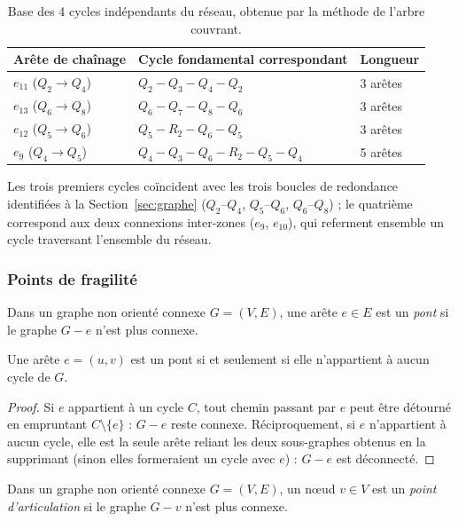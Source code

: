 \documentclass[11pt]{ama-article}
\begin{document}
\begin{table}[h]
\centering
\begin{tabular}{@{}lll@{}}
\toprule
Arête de chaînage & Cycle fondamental correspondant & Longueur \\
\midrule
$e_{11}$ ($Q_2\to Q_4$) & $Q_2-Q_3-Q_4-Q_2$ & 3 arêtes \\
$e_{13}$ ($Q_6\to Q_8$) & $Q_6-Q_7-Q_8-Q_6$ & 3 arêtes \\
$e_{12}$ ($Q_5\to Q_6$) & $Q_5-R_2-Q_6-Q_5$ & 3 arêtes \\
$e_{9}$ ($Q_4\to Q_5$) & $Q_4-Q_3-Q_6-R_2-Q_5-Q_4$ & 5 arêtes \\
\bottomrule
\end{tabular}
\caption{Base des 4 cycles indépendants du réseau, obtenue par la méthode de l'arbre couvrant.}
\label{tab:cycles}
\end{table}

Les trois premiers cycles coïncident avec les trois boucles de redondance identifiées à la
Section~\ref{sec:graphe} ($Q_2$--$Q_4$, $Q_5$--$Q_6$, $Q_6$--$Q_8$) ; le quatrième correspond
aux deux connexions inter-zones ($e_9$, $e_{10}$), qui referment ensemble un cycle traversant
l'ensemble du réseau.

\subsubsection{Points de fragilité}
\label{sec:ponts}

\begin{definition}[Pont]
Dans un graphe non orienté connexe $G=(V,E)$, une arête $e\in E$ est un \emph{pont} si le
graphe $G-e$ n'est plus connexe.
\end{definition}

\begin{proposition}
Une arête $e=(u,v)$ est un pont si et seulement si elle n'appartient à aucun cycle de $G$.
\end{proposition}

\begin{proof}
Si $e$ appartient à un cycle $C$, tout chemin passant par $e$ peut être détourné en empruntant
$C\setminus\{e\}$ : $G-e$ reste connexe. Réciproquement, si $e$ n'appartient à aucun cycle,
elle est la seule arête reliant les deux sous-graphes obtenus en la supprimant (sinon elles
formeraient un cycle avec $e$) : $G-e$ est déconnecté.
\end{proof}

\begin{definition}
Dans un graphe non orienté connexe $G=(V,E)$, un nœud $v\in V$ est un \emph{point
d'articulation} si le graphe $G-v$ n'est plus connexe.
\end{definition}
\end{document}
